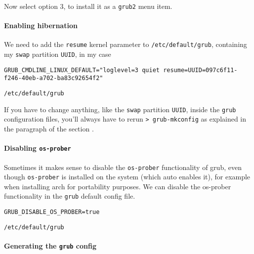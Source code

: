 \documentclass[10pt]{dustdoc}
\begin{document}
Now select option 3, to install it as a \texttt{grub2} menu item.

\paragraph{Enabling hibernation}%
\label{par:enabling-hibernation}

We need to add the \texttt{resume} kernel parameter to \texttt{/etc/default/grub}, containing my \texttt{swap} partition \texttt{UUID}, in my case

\begin{mintedlisting}
    \begin{verbatim}
GRUB_CMDLINE_LINUX_DEFAULT="loglevel=3 quiet resume=UUID=097c6f11-f246-40eb-a702-ba83c92654f2"
    \end{verbatim}

    \caption{\texttt{/etc/default/grub}}
\end{mintedlisting}

\begin{NOTE}
    If you have to change anything, like the \texttt{swap} partition \texttt{UUID}, inside the \texttt{grub} configuration files, you’ll always have to rerun \texttt{> grub-mkconfig} as explained in the paragraph  of the section .
\end{NOTE}

\paragraph{Disabling \texttt{os-prober}}%
\label{par:disabling-os-prober}

Sometimes it makes sense to disable the \texttt{os-prober} functionality of grub, even though \texttt{os-prober} is installed on the system (which auto enables it), for example when installing arch for portability purposes.
We can disable the os-prober functionality in the \texttt{grub} default config file.

\begin{mintedlisting}
    \begin{verbatim}
GRUB_DISABLE_OS_PROBER=true
    \end{verbatim}

    \caption{\texttt{/etc/default/grub}}
\end{mintedlisting}

\paragraph{Generating the \texttt{grub} config}%
\label{par:generating-the-grub-config}
\end{document}
